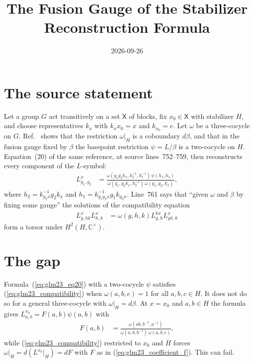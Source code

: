\documentclass{article}
\title{The Fusion Gauge of the Stabilizer Reconstruction Formula}
\author{}
\date{2026-09-26}
\begin{document}
\maketitle
{}

\section{The source statement}

Let a group $G$ act transitively on a set $\mathsf X$ of blocks, fix
$x_0\in\mathsf X$ with stabilizer $H$, and choose representatives $k_x$
with $k_xx_0=x$ and $k_{x_0}=e$. Let $\omega$ be a three-cocycle on $G$.
Ref.~\cite[source lines~740--747]{GarreRubio2023MPOSym} shows that the
restriction $\omega|_H$ is a coboundary $d\beta$, and that in the fusion
gauge fixed by $\beta$ the basepoint restriction $\psi=L/\beta$ is a
two-cocycle on $H$. Equation~(20) of the same reference, at source
lines~752--759, then reconstructs every component of the $L$-symbol:
\begin{align}
    L^x_{g_1,g_2}
        &=\frac{\omega(g_1g_2k_x,h_2^{-1},h_1^{-1})\,\psi(h_1,h_2)}
          {\omega(g_1,g_2k_x,h_2^{-1})\,\omega(g_1,g_2,k_x)},
    \label{eq:glm23_eq20}
\end{align}
where $h_2=k_{g_2x}^{-1}g_2k_x$ and $h_1=k_{g_1g_2x}^{-1}g_1k_{g_2x}$.
Line~761 says that ``given $\omega$ and $\beta$ by fixing some gauge'' the
solutions of the compatibility equation
\begin{align}
    L^x_{g,hk}L^x_{h,k}
        &=\omega(g,h,k)L^{kx}_{g,h}L^x_{gh,k}
    \label{eq:glm23_compatibility}
\end{align}
form a torsor under $H^2(H,\mathbb C^\times)$.

\section{The gap}

Formula~(\ref{eq:glm23_eq20}) with a two-cocycle $\psi$ satisfies
(\ref{eq:glm23_compatibility}) when $\omega(a,b,c)=1$ for all
$a,b,c\in H$. It does not do so for a general three-cocycle with
$\omega|_H=d\beta$. At $x=x_0$ and $a,b\in H$ the formula gives
$L^{x_0}_{a,b}=F(a,b)\psi(a,b)$ with
\begin{align}
    F(a,b)
        &=\frac{\omega(ab,b^{-1},a^{-1})}{\omega(a,b,b^{-1})\,\omega(a,b,e)},
    \label{eq:glm23_coefficient_f}
\end{align}
while (\ref{eq:glm23_compatibility}) restricted to $x_0$ and $H$ forces
$\omega|_H=d(L^{x_0}|_H)=dF$ with $F$ as in (\ref{eq:glm23_coefficient_f}). This can fail.
\end{document}
